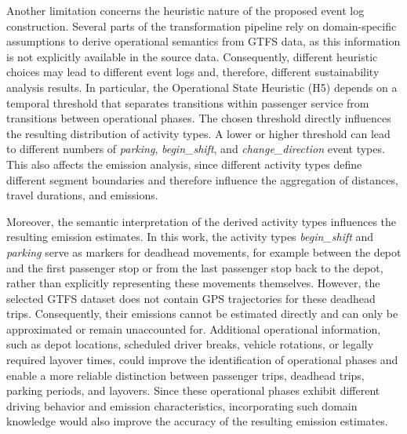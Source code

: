 Another limitation concerns the heuristic nature of the proposed event log construction. Several parts of the transformation pipeline rely on domain-specific assumptions to derive operational semantics from GTFS data, as this information is not explicitly available in the source data. Consequently, different heuristic choices may lead to different event logs and, therefore, different sustainability analysis results. In particular, the Operational State Heuristic (H5) depends on a temporal threshold that separates transitions within passenger service from transitions between operational phases. The chosen threshold directly influences the resulting distribution of activity types. A lower or higher threshold can lead to different numbers of \textit{parking}, \textit{begin\_shift}, and \textit{change\_direction} event types. This also affects the emission analysis, since different activity types define different segment boundaries and therefore influence the aggregation of distances, travel durations, and emissions.

Moreover, the semantic interpretation of the derived activity types influences the resulting emission estimates. In this work, the activity types \textit{begin\_shift} and \textit{parking} serve as markers for deadhead movements, for example between the depot and the first passenger stop or from the last passenger stop back to the depot, rather than explicitly representing these movements themselves. However, the selected GTFS dataset does not contain GPS trajectories for these deadhead trips. Consequently, their emissions cannot be estimated directly and can only be approximated or remain unaccounted for. Additional operational information, such as depot locations, scheduled driver breaks, vehicle rotations, or legally required layover times, could improve the identification of operational phases and enable a more reliable distinction between passenger trips, deadhead trips, parking periods, and layovers. Since these operational phases exhibit different driving behavior and emission characteristics, incorporating such domain knowledge would also improve the accuracy of the resulting emission estimates.

